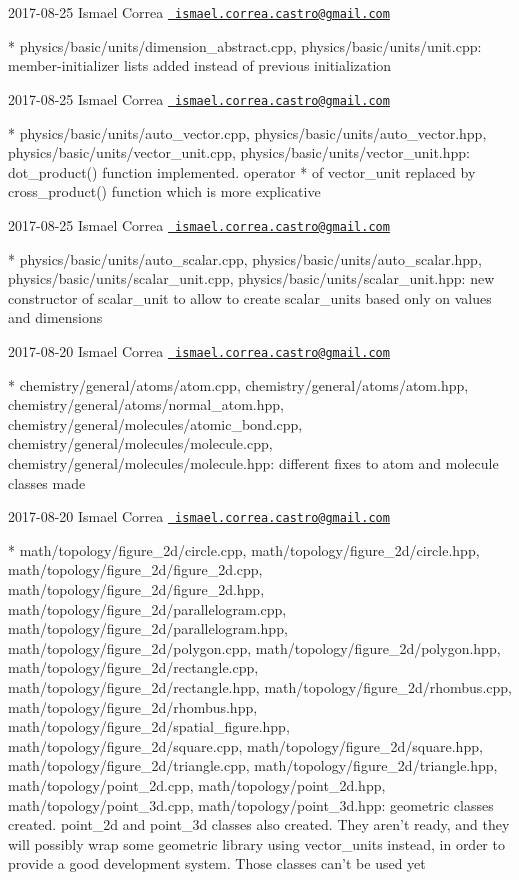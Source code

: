  2017-\/08-\/25 Ismael Correa \href{mailto:ismael.correa.castro@gmail.com}{\texttt{ ismael.\+correa.\+castro@gmail.\+com}} \begin{DoxyVerb}* physics/basic/units/dimension_abstract.cpp,
physics/basic/units/unit.cpp: member-initializer lists added instead
of previous initialization
\end{DoxyVerb}
 2017-\/08-\/25 Ismael Correa \href{mailto:ismael.correa.castro@gmail.com}{\texttt{ ismael.\+correa.\+castro@gmail.\+com}} \begin{DoxyVerb}* physics/basic/units/auto_vector.cpp,
physics/basic/units/auto_vector.hpp,
physics/basic/units/vector_unit.cpp,
physics/basic/units/vector_unit.hpp: dot_product() function
implemented. operator * of vector_unit replaced by cross_product()
function which is more explicative
\end{DoxyVerb}
 2017-\/08-\/25 Ismael Correa \href{mailto:ismael.correa.castro@gmail.com}{\texttt{ ismael.\+correa.\+castro@gmail.\+com}} \begin{DoxyVerb}* physics/basic/units/auto_scalar.cpp,
physics/basic/units/auto_scalar.hpp,
physics/basic/units/scalar_unit.cpp,
physics/basic/units/scalar_unit.hpp: new constructor of scalar_unit
to allow to create scalar_units based only on values and dimensions
\end{DoxyVerb}
 2017-\/08-\/20 Ismael Correa \href{mailto:ismael.correa.castro@gmail.com}{\texttt{ ismael.\+correa.\+castro@gmail.\+com}} \begin{DoxyVerb}* chemistry/general/atoms/atom.cpp,
chemistry/general/atoms/atom.hpp,
chemistry/general/atoms/normal_atom.hpp,
chemistry/general/molecules/atomic_bond.cpp,
chemistry/general/molecules/molecule.cpp,
chemistry/general/molecules/molecule.hpp: different fixes to atom
and molecule classes made
\end{DoxyVerb}
 2017-\/08-\/20 Ismael Correa \href{mailto:ismael.correa.castro@gmail.com}{\texttt{ ismael.\+correa.\+castro@gmail.\+com}} \begin{DoxyVerb}* math/topology/figure_2d/circle.cpp,
math/topology/figure_2d/circle.hpp,
math/topology/figure_2d/figure_2d.cpp,
math/topology/figure_2d/figure_2d.hpp,
math/topology/figure_2d/parallelogram.cpp,
math/topology/figure_2d/parallelogram.hpp,
math/topology/figure_2d/polygon.cpp,
math/topology/figure_2d/polygon.hpp,
math/topology/figure_2d/rectangle.cpp,
math/topology/figure_2d/rectangle.hpp,
math/topology/figure_2d/rhombus.cpp,
math/topology/figure_2d/rhombus.hpp,
math/topology/figure_2d/spatial_figure.hpp,
math/topology/figure_2d/square.cpp,
math/topology/figure_2d/square.hpp,
math/topology/figure_2d/triangle.cpp,
math/topology/figure_2d/triangle.hpp, math/topology/point_2d.cpp,
math/topology/point_2d.hpp, math/topology/point_3d.cpp,
math/topology/point_3d.hpp: geometric classes created. point_2d and
point_3d classes also created. They aren't ready, and they will
possibly wrap some geometric library using vector_units instead, in
order to provide a good development system. Those classes can't be
used yet
\end{DoxyVerb}
